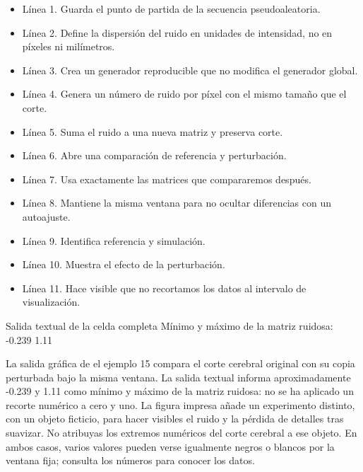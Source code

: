 \begin{itemize}

\item Línea 1. Guarda el punto de partida de la secuencia pseudoaleatoria.

\item Línea 2. Define la dispersión del ruido en unidades de intensidad, no en píxeles ni milímetros.

\item Línea 3. Crea un generador reproducible que no modifica el generador global.

\item Línea 4. Genera un número de ruido por píxel con el mismo tamaño que el corte.

\item Línea 5. Suma el ruido a una nueva matriz y preserva corte.

\item Línea 6. Abre una comparación de referencia y perturbación.

\item Línea 7. Usa exactamente las matrices que compararemos después.

\item Línea 8. Mantiene la misma ventana para no ocultar diferencias con un autoajuste.

\item Línea 9. Identifica referencia y simulación.

\item Línea 10. Muestra el efecto de la perturbación.

\item Línea 11. Hace visible que no recortamos los datos al intervalo de visualización.

\end{itemize}

\begin{Salida}{Salida textual de la celda completa}
Mínimo y máximo de la matriz ruidosa: -0.239 1.11
\end{Salida}



La salida gráfica de el ejemplo 15 compara el corte cerebral original con su copia perturbada bajo la misma ventana. La salida textual informa aproximadamente -0.239 y 1.11 como mínimo y máximo de la matriz ruidosa: no se ha aplicado un recorte numérico a cero y uno. La figura impresa añade un experimento distinto, con un objeto ficticio, para hacer visibles el ruido y la pérdida de detalles tras suavizar. No atribuyas los extremos numéricos del corte cerebral a ese objeto. En ambos casos, varios valores pueden verse igualmente negros o blancos por la ventana fija; consulta los números para conocer los datos.



